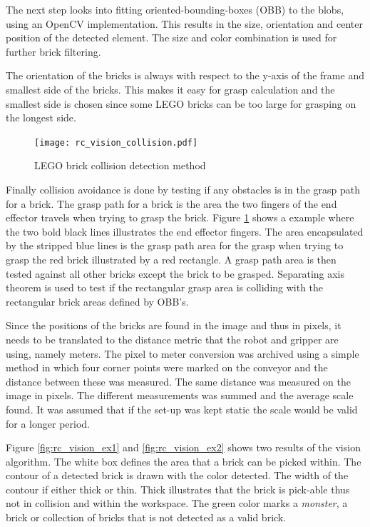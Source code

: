 The next step looks into fitting oriented-bounding-boxes (OBB) to the blobs, using an OpenCV\cite{opencv} implementation. This results in the size, orientation and center position of the detected element. The size and color combination is used for further brick filtering.

The orientation of the bricks is always with respect to the y-axis of the frame and smallest side of the bricks. This makes it easy for grasp calculation and the smallest side is chosen since some LEGO bricks can be too large for grasping on the longest side. 
	
	\begin{figure}[H]
		\centering
	    \texttt{[image: rc\_vision\_collision.pdf]}
	    \caption{LEGO brick collision detection method}
		\label{fig:rc_vision_collision}
	\end{figure}
	
Finally collision avoidance is done by testing if any obstacles is in the grasp path for a brick. The grasp path for a brick is the area the two fingers of the end effector travels when trying to grasp the brick. Figure \ref{fig:rc_vision_collision} shows a example where the two bold black lines illustrates the end effector fingers. The area encapsulated by the stripped blue lines is the grasp path area for the grasp when trying to grasp the red brick illustrated by a red rectangle. A grasp path area is then tested against all other bricks except the brick to be grasped. Separating axis theorem\cite{Gottschalk:1996:OHS:237170.237244} is used to test if the rectangular grasp area is colliding with the rectangular brick areas defined by OBB's.

Since the positions of the bricks are found in the image and thus in pixels, it needs to be translated to the distance metric that the robot and gripper are using, namely meters. The pixel to meter conversion was archived using a simple method in which four corner points were marked on the conveyor and the distance between these was measured. The same distance was measured on the image in pixels. The different measurements was summed and the average scale found. It was assumed that if the set-up was kept static the scale would be valid for a longer period.

Figure \ref{fig:rc_vision_ex1} and \ref{fig:rc_vision_ex2} shows two results of the vision algorithm. The white box defines the area that a brick can be picked within. The contour of a detected brick is drawn with the color detected. The width of the contour if either thick or thin. Thick illustrates that the brick is pick-able thus not in collision and within the workspace. The green color marks a \textit{monster}, a brick or collection of bricks that is not detected as a valid brick. 

